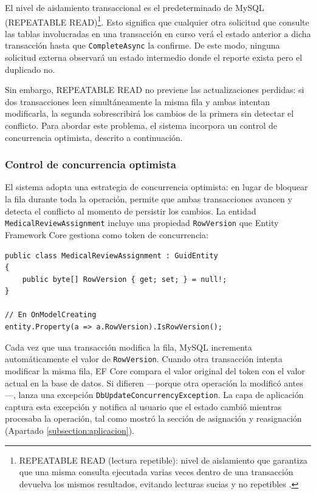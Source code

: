 El nivel de aislamiento transaccional es el predeterminado de MySQL (REPEATABLE READ)\footnote{REPEATABLE READ (lectura repetible): nivel de aislamiento que garantiza que una misma consulta ejecutada varias veces dentro de una transacción devuelva los mismos resultados, evitando lecturas sucias y no repetibles \cite{mysql_isolation}.}. 
Esto significa que cualquier otra solicitud que consulte las tablas involucradas en una transacción en curso verá el estado anterior a dicha transacción hasta que \texttt{CompleteAsync} la confirme. 
De este modo, ninguna solicitud externa observará un estado intermedio donde el reporte exista pero el duplicado no. 

Sin embargo, REPEATABLE READ no previene las actualizaciones perdidas: si dos transacciones leen simultáneamente la misma fila y ambas intentan modificarla, la segunda sobrescribirá los cambios de la primera sin detectar el conflicto. 
Para abordar este problema, el sistema incorpora un control de concurrencia optimista, descrito a continuación.

\subsubsection{Control de concurrencia optimista}

El sistema adopta una estrategia de concurrencia optimista: en lugar de bloquear la fila durante toda la operación, permite que ambas transacciones avancen y detecta el conflicto al momento de persistir los cambios. 
La entidad \texttt{MedicalReviewAssignment} incluye una propiedad \texttt{RowVersion} que Entity Framework Core gestiona como token de concurrencia:

\begin{lstlisting}[language={[Sharp]C}, caption={Token de concurrencia en MedicalReviewAssignment}, label={lst:rowversion}]
public class MedicalReviewAssignment : GuidEntity
{
    public byte[] RowVersion { get; set; } = null!;
}

// En OnModelCreating
entity.Property(a => a.RowVersion).IsRowVersion();
\end{lstlisting}

Cada vez que una transacción modifica la fila, MySQL incrementa automáticamente el valor de \texttt{RowVersion}. Cuando otra transacción intenta modificar la misma fila, EF Core compara el valor original del token con el valor actual en la base de datos. Si difieren —porque otra operación la modificó antes—, lanza una excepción \texttt{DbUpdateConcurrencyException}. 
La capa de aplicación captura esta excepción y notifica al usuario que el estado cambió mientras procesaba la operación, tal como mostró la sección de asignación y reasignación (Apartado \ref{subsection:aplicacion}).

